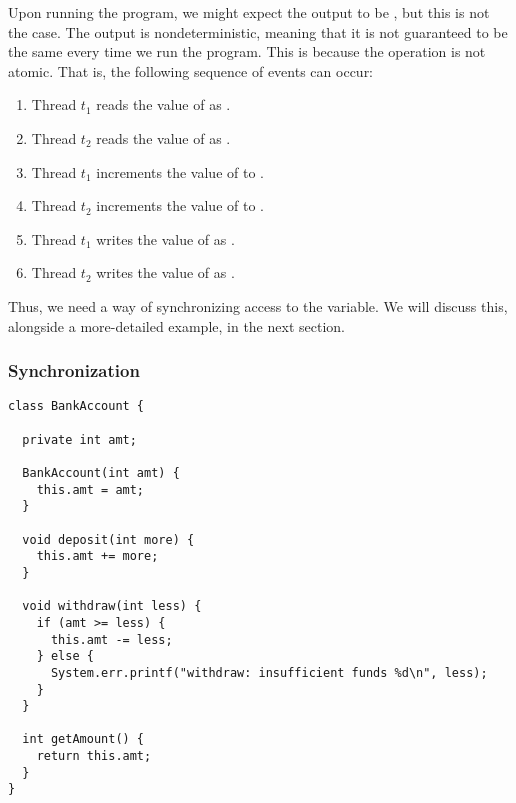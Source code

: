 Upon running the program, we might expect the output to be , but this is not the case. The output is nondeterministic, meaning that it is not guaranteed to be the same every time we run the program. This is because the  operation is not atomic. That is, the following sequence of events can occur:

\begin{enumerate}
  \item Thread $t_1$ reads the value of  as .
  \item Thread $t_2$ reads the value of  as .
  \item Thread $t_1$ increments the value of  to .
  \item Thread $t_2$ increments the value of  to .
  \item Thread $t_1$ writes the value of  as .
  \item Thread $t_2$ writes the value of  as .
\end{enumerate}

Thus, we need a way of synchronizing access to the  variable. We will discuss this, alongside a more-detailed example, in the next section.

\subsubsection*{Synchronization}


\begin{lstlisting}[language=MyJava]
class BankAccount {

  private int amt;

  BankAccount(int amt) { 
    this.amt = amt; 
  }

  void deposit(int more) { 
    this.amt += more; 
  }

  void withdraw(int less) {
    if (amt >= less) { 
      this.amt -= less; 
    } else { 
      System.err.printf("withdraw: insufficient funds %d\n", less); 
    }
  }

  int getAmount() { 
    return this.amt; 
  }
}
\end{lstlisting}

